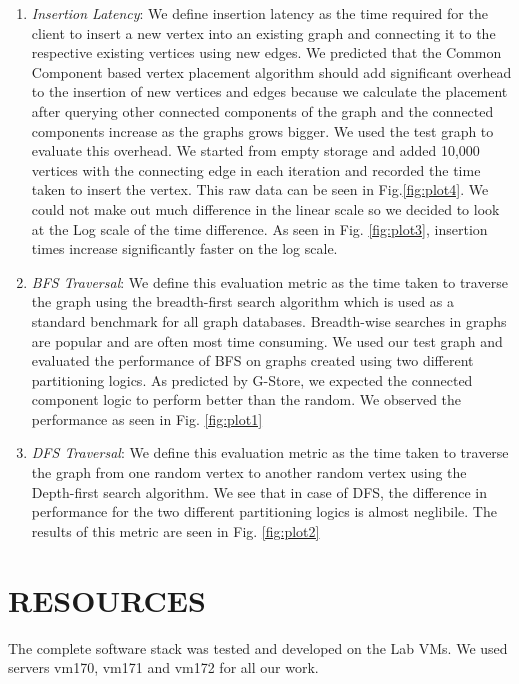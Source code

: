 \documentclass[letterpaper, 11 pt, conference]{ieeeconf}  %
\begin{document}
\begin{enumerate}
\item \textit{Insertion Latency}: We define insertion latency as the time required for the client to insert a new vertex into an existing graph and connecting it to the respective existing vertices using new edges. We predicted that the Common Component based vertex placement algorithm should add significant overhead to the insertion of new vertices and edges because we calculate the placement after querying other connected components of the graph and the connected components increase as the graphs grows bigger. We used the test graph to evaluate this overhead. We started from empty storage and added 10,000 vertices with the connecting edge in each iteration and recorded the time taken to insert the vertex. This raw data can be seen in Fig.\ref{fig:plot4}. We could not make out much difference in the linear scale so we decided to look at the Log scale of the time difference. As seen in Fig. \ref{fig:plot3}, insertion times increase significantly faster on the log scale.\\

\item \textit{BFS Traversal}: We define this evaluation metric as the time taken to traverse the graph using the breadth-first search algorithm which is used as a standard benchmark for all graph databases. Breadth-wise searches in graphs are popular and are often most time consuming. We used our test graph and evaluated the performance of BFS on graphs created using two different partitioning logics. As predicted by G-Store\cite{g-store}, we expected the connected component logic to perform better than the random. We observed the performance as seen in Fig. \ref{fig:plot1} 
\item \textit{DFS Traversal}: We define this evaluation metric as the time taken to traverse the graph from one random vertex to another random vertex using the Depth-first search algorithm. We see that in case of DFS, the difference in performance for the two different partitioning logics is almost neglibile. The results of this metric are seen in Fig. \ref{fig:plot2}

\end{enumerate}


\section{RESOURCES}
The complete software stack was tested and developed on the Lab VMs. We used servers vm170, vm171 and vm172 for all our work. 
\addtolength{\textheight}{-12cm}   %
\end{document}
